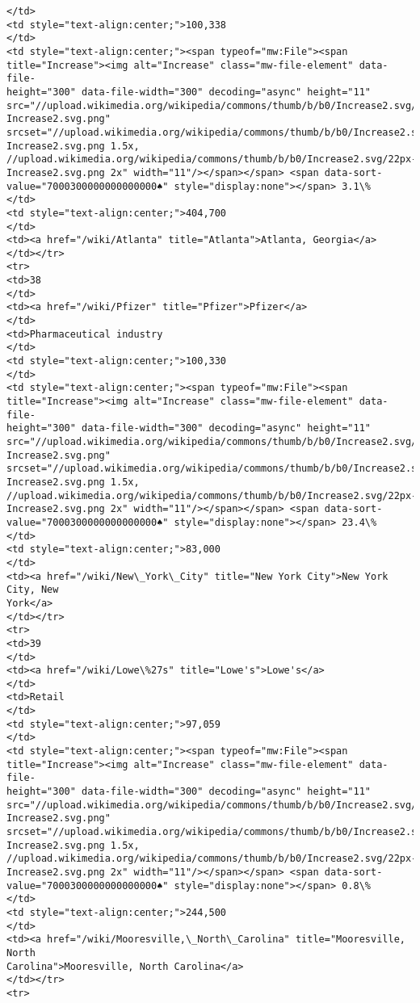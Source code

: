 \documentclass[11pt]{article}
\begin{document}
\begin{Verbatim}[commandchars=\\\{\}]
</td>
<td style="text-align:center;">100,338
</td>
<td style="text-align:center;"><span typeof="mw:File"><span
title="Increase"><img alt="Increase" class="mw-file-element" data-file-
height="300" data-file-width="300" decoding="async" height="11"
src="//upload.wikimedia.org/wikipedia/commons/thumb/b/b0/Increase2.svg/11px-
Increase2.svg.png"
srcset="//upload.wikimedia.org/wikipedia/commons/thumb/b/b0/Increase2.svg/17px-
Increase2.svg.png 1.5x,
//upload.wikimedia.org/wikipedia/commons/thumb/b/b0/Increase2.svg/22px-
Increase2.svg.png 2x" width="11"/></span></span> <span data-sort-
value="7000300000000000000♠" style="display:none"></span> 3.1\%
</td>
<td style="text-align:center;">404,700
</td>
<td><a href="/wiki/Atlanta" title="Atlanta">Atlanta, Georgia</a>
</td></tr>
<tr>
<td>38
</td>
<td><a href="/wiki/Pfizer" title="Pfizer">Pfizer</a>
</td>
<td>Pharmaceutical industry
</td>
<td style="text-align:center;">100,330
</td>
<td style="text-align:center;"><span typeof="mw:File"><span
title="Increase"><img alt="Increase" class="mw-file-element" data-file-
height="300" data-file-width="300" decoding="async" height="11"
src="//upload.wikimedia.org/wikipedia/commons/thumb/b/b0/Increase2.svg/11px-
Increase2.svg.png"
srcset="//upload.wikimedia.org/wikipedia/commons/thumb/b/b0/Increase2.svg/17px-
Increase2.svg.png 1.5x,
//upload.wikimedia.org/wikipedia/commons/thumb/b/b0/Increase2.svg/22px-
Increase2.svg.png 2x" width="11"/></span></span> <span data-sort-
value="7000300000000000000♠" style="display:none"></span> 23.4\%
</td>
<td style="text-align:center;">83,000
</td>
<td><a href="/wiki/New\_York\_City" title="New York City">New York City, New
York</a>
</td></tr>
<tr>
<td>39
</td>
<td><a href="/wiki/Lowe\%27s" title="Lowe's">Lowe's</a>
</td>
<td>Retail
</td>
<td style="text-align:center;">97,059
</td>
<td style="text-align:center;"><span typeof="mw:File"><span
title="Increase"><img alt="Increase" class="mw-file-element" data-file-
height="300" data-file-width="300" decoding="async" height="11"
src="//upload.wikimedia.org/wikipedia/commons/thumb/b/b0/Increase2.svg/11px-
Increase2.svg.png"
srcset="//upload.wikimedia.org/wikipedia/commons/thumb/b/b0/Increase2.svg/17px-
Increase2.svg.png 1.5x,
//upload.wikimedia.org/wikipedia/commons/thumb/b/b0/Increase2.svg/22px-
Increase2.svg.png 2x" width="11"/></span></span> <span data-sort-
value="7000300000000000000♠" style="display:none"></span> 0.8\%
</td>
<td style="text-align:center;">244,500
</td>
<td><a href="/wiki/Mooresville,\_North\_Carolina" title="Mooresville, North
Carolina">Mooresville, North Carolina</a>
</td></tr>
<tr>

\end{Verbatim}
\end{document}
